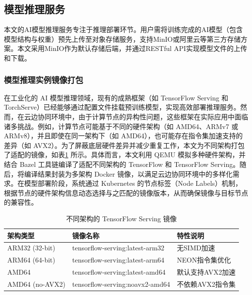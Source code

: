 \subsection{模型推理服务}

本文的AI模型推理服务专注于推理部署环节。用户需将训练完成的AI模型（包含模型结构与权重）预先上传至对象存储服务，支持MinIO或阿里云等第三方存储方案。本文采用MinIO作为默认存储后端，并通过RESTful API实现模型文件的上传和下载。

\subsubsection{模型推理实例镜像打包}

在工业化的 AI 模型推理领域，现有的成熟框架（如 TensorFlow Serving 和 TorchServe）已经能够通过配置文件挂载预训练模型，实现高效部署推理服务。然而，在云边协同环境中，由于计算节点的异构性问题，这些框架在实际应用中面临诸多挑战。例如，计算节点可能基于不同的硬件架构（如 AMD64、ARMv7 或 ARMv8），并且即使在同一架构下（如 AMD64），也可能存在指令集加速支持的差异（如 AVX2）。为了屏蔽底层硬件差异并减少重复工作，本文为不同架构打包了适配的镜像，如表\ref{tab:multi-arch-images} 所示。具体而言，本文利用 QEMU 模拟多种硬件架构，并结合 Bazel 工具链编译了适配不同架构的 TensorFlow 和 TensorFlow Serving。随后，将编译结果封装为多架构 Docker 镜像，以满足云边协同环境中的多样化需求。在模型部署阶段，系统通过 Kubernetes 的节点标签（Node Labels）机制，根据节点的硬件架构信息动态选择与之匹配的镜像版本，从而确保镜像与目标节点的兼容性。

\begin{table}[ht]
    \renewcommand{\arraystretch}{1.5}
    \centering
    \caption{不同架构的 TensorFlow Serving 镜像}
    \label{tab:multi-arch-images}
    \begin{tabular}{lll}
        \toprule
        \textbf{架构类型} & \textbf{镜像名称} & \textbf{特性说明} \\
        \midrule
        ARM32 (32-bit) & tensorflow-serving:latest-arm32 & 无SIMD加速 \\
        ARM64 (64-bit) & tensorflow-serving:latest-arm64 & NEON指令集优化 \\
        AMD64 & tensorflow-serving:latest-amd64 & 默认支持AVX2加速 \\
        AMD64 (no-AVX2) & tensorflow-serving:noavx2-amd64 & 不依赖AVX2指令集 \\
        \bottomrule
    \end{tabular}
\end{table}


